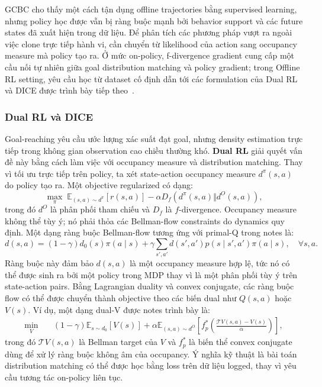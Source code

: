 GCBC cho thấy một cách tận dụng offline trajectories bằng supervised learning, nhưng policy học được vẫn bị ràng buộc mạnh bởi behavior support và các future states đã xuất hiện trong dữ liệu.
Để phân tích các phương pháp vượt ra ngoài việc clone trực tiếp hành vi, cần chuyển từ likelihood của action sang occupancy measure mà policy tạo ra.
Ở mức on-policy, f-divergence gradient cung cấp một cầu nối tự nhiên giữa goal distribution matching và policy gradient; trong Offline RL setting, yêu cầu học từ dataset cố định dẫn tới các formulation của Dual RL và DICE được trình bày tiếp theo~\cite{eysenbach2025generativerl}.

\subsubsection{Dual RL và DICE}

Goal-reaching yêu cầu ước lượng xác suất đạt goal, nhưng density estimation trực tiếp trong không gian observation cao chiều thường khó.
\textbf{Dual RL} giải quyết vấn đề này bằng cách làm việc với occupancy measure và distribution matching.
Thay vì tối ưu trực tiếp trên policy, ta xét state-action occupancy measure $d^\pi(s,a)$ do policy tạo ra.
Một objective regularized có dạng:
\begin{equation}
    \max_\pi
    \;
    \mathbb{E}_{(s,a)\sim d^\pi}
    [r(s,a)]
    -
    \alpha
    D_f(d^\pi(s,a)\Vert d^O(s,a)),
    \label{eq:tv2-regularized-occupancy}
\end{equation}
trong đó $d^O$ là phân phối tham chiếu và $D_f$ là $f$-divergence.
Occupancy measure không thể tùy ý; nó phải thỏa các Bellman-flow constraints do dynamics quy định.
Một dạng ràng buộc Bellman-flow tương ứng với primal-Q trong notes là:
\begin{equation}
    d(s,a)
    =
    (1-\gamma)d_0(s)\pi(a\mid s)
    +
    \gamma
    \sum_{s',a'}
    d(s',a')p(s\mid s',a')\pi(a\mid s),
    \quad \forall s,a.
    \label{eq:tv2-bellman-flow}
\end{equation}
Ràng buộc này đảm bảo $d(s,a)$ là một occupancy measure hợp lệ, tức nó có thể được sinh ra bởi một policy trong MDP thay vì là một phân phối tùy ý trên state-action pairs.
Bằng Lagrangian duality và convex conjugate, các ràng buộc flow có thể được chuyển thành objective theo các biến dual như $Q(s,a)$ hoặc $V(s)$.
Ví dụ, một dạng dual-V được notes trình bày là:
\begin{equation}
\begin{aligned}
    \min_V\quad
    &(1-\gamma)\mathbb{E}_{s\sim d_0}[V(s)]
    +
    \alpha
    \mathbb{E}_{(s,a)\sim d^O}
    \left[
        f_p^*
        \left(
            \frac{\mathcal{T}V(s,a)-V(s)}{\alpha}
        \right)
    \right],
\end{aligned}
    \label{eq:tv2-dual-v}
\end{equation}
trong đó $\mathcal{T}V(s,a)$ là Bellman target của $V$ và $f_p^*$ là biến thể convex conjugate dùng để xử lý ràng buộc không âm của occupancy.
Ý nghĩa kỹ thuật là bài toán distribution matching có thể được học bằng loss trên dữ liệu logged, thay vì yêu cầu tương tác on-policy liên tục.

